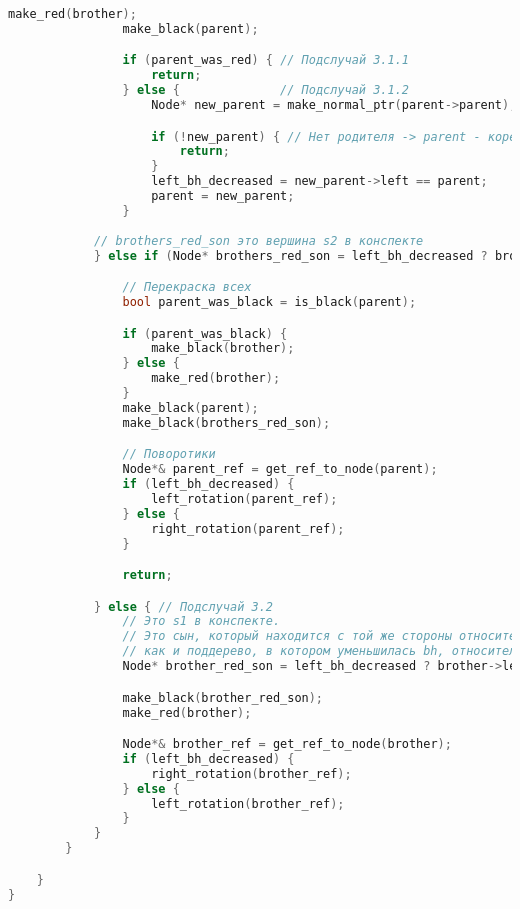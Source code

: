 \begin{lstlisting}[language=C++]
                make_red(brother);
                make_black(parent);

                if (parent_was_red) { // Подслучай 3.1.1
                    return;
                } else {              // Подслучай 3.1.2
                    Node* new_parent = make_normal_ptr(parent->parent);

                    if (!new_parent) { // Нет родителя -> parent - корень. Значит, во всем дереве уменишьлась черная высота.
                        return;
                    }
                    left_bh_decreased = new_parent->left == parent;
                    parent = new_parent;
                }
            
            // brothers_red_son это вершина s2 в конспекте
            } else if (Node* brothers_red_son = left_bh_decreased ? brother->right : brother->left; is_red(brothers_red_son)) { // Подслучай 3.3.

                // Перекраска всех
                bool parent_was_black = is_black(parent);

                if (parent_was_black) {
                    make_black(brother);
                } else {
                    make_red(brother);
                }
                make_black(parent);
                make_black(brothers_red_son);

                // Поворотики
                Node*& parent_ref = get_ref_to_node(parent);
                if (left_bh_decreased) {
                    left_rotation(parent_ref);
                } else {
                    right_rotation(parent_ref);
                }

                return;

            } else { // Подслучай 3.2
                // Это s1 в конспекте.
                // Это сын, который находится с той же стороны относительно brother,
                // как и поддерево, в котором уменьшилась bh, относительно parent.
                Node* brother_red_son = left_bh_decreased ? brother->left : brother->right;

                make_black(brother_red_son);
                make_red(brother);

                Node*& brother_ref = get_ref_to_node(brother);
                if (left_bh_decreased) {
                    right_rotation(brother_ref);
                } else {
                    left_rotation(brother_ref);
                }
            }
        }

    }
}


\end{lstlisting}
